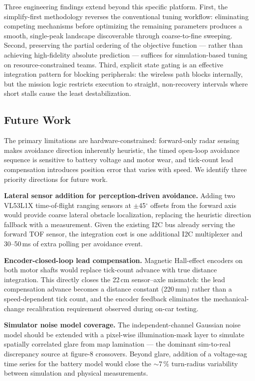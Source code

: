 \documentclass[letterpaper,journal]{IEEEtran}
\begin{document}
Three engineering findings extend beyond this specific platform. First, the simplify-first methodology reverses the conventional tuning workflow: eliminating competing mechanisms before optimizing the remaining parameters produces a smooth, single-peak landscape discoverable through coarse-to-fine sweeping. Second, preserving the partial ordering of the objective function --- rather than achieving high-fidelity absolute prediction --- suffices for simulation-based tuning on resource-constrained teams. Third, explicit state gating is an effective integration pattern for blocking peripherals: the wireless path blocks internally, but the mission logic restricts execution to straight, non-recovery intervals where short stalls cause the least destabilization.

\subsection{Future Work}

The primary limitations are hardware-constrained: forward-only radar sensing makes avoidance direction inherently heuristic, the timed open-loop avoidance sequence is sensitive to battery voltage and motor wear, and tick-count lead compensation introduces position error that varies with speed. We identify three priority directions for future work.

\textbf{Lateral sensor addition for perception-driven avoidance.} Adding two VL53L1X time-of-flight ranging sensors at $\pm$45$^\circ$ offsets from the forward axis would provide coarse lateral obstacle localization, replacing the heuristic direction fallback with a measurement. Given the existing I2C bus already serving the forward TOF sensor, the integration cost is one additional I2C multiplexer and 30--50\,ms of extra polling per avoidance event.

\textbf{Encoder-closed-loop lead compensation.} Magnetic Hall-effect encoders on both motor shafts would replace tick-count advance with true distance integration. This directly closes the 22\,cm sensor--axle mismatch: the lead compensation advance becomes a distance constant (220\,mm) rather than a speed-dependent tick count, and the encoder feedback eliminates the mechanical-change recalibration requirement observed during on-car testing.

\textbf{Simulator noise model coverage.} The independent-channel Gaussian noise model should be extended with a pixel-wise illumination-mask layer to simulate spatially correlated glare from map lamination --- the dominant sim-to-real discrepancy source at figure-8 crossovers. Beyond glare, addition of a voltage-sag time series for the battery model would close the $\sim$7\,\% turn-radius variability between simulation and physical measurements.
\end{document}
